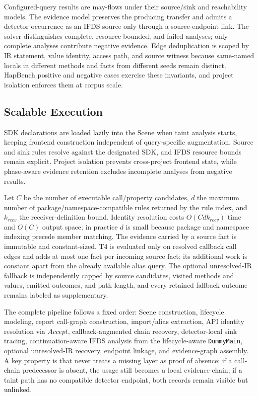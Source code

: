 Configured-query results are may-flows under their source/sink and reachability models. The evidence model preserves the producing transfer and admits a detector occurrence as an IFDS source only through a source-endpoint link. The solver distinguishes complete, resource-bounded, and failed analyses; only complete analyses contribute negative evidence. Edge deduplication is scoped by IR statement, value identity, access path, and source witness because same-named locals in different methods and facts from different seeds remain distinct. HapBench positive and negative cases exercise these invariants, and project isolation enforces them at corpus scale.

\subsection{Scalable Execution}

SDK declarations are loaded lazily into the Scene when taint analysis starts, keeping frontend construction independent of query-specific augmentation. Source and sink rules resolve against the designated SDK, and IFDS resource bounds remain explicit. Project isolation prevents cross-project frontend state, while phase-aware evidence retention excludes incomplete analyses from negative results.

Let $C$ be the number of executable call/property candidates, $d$ the maximum number of package/namespace-compatible rules returned by the rule index, and $k_{recv}$ the receiver-definition bound. Identity resolution costs $O(Cdk_{recv})$ time and $O(C)$ output space; in practice $d$ is small because package and namespace indexing precede member matching. The evidence carried by a source fact is immutable and constant-sized. T4 is evaluated only on resolved callback call edges and adds at most one fact per incoming source fact; its additional work is constant apart from the already available alias query. The optional unresolved-IR fallback is independently capped by source candidates, visited methods and values, emitted outcomes, and path length, and every retained fallback outcome remains labeled as supplementary.

The complete pipeline follows a fixed order: Scene construction, lifecycle modeling, report call-graph construction, import/alias extraction, API identity resolution via $\mathit{Accept}$, callback-augmented chain recovery, detector-local sink tracing, continuation-aware IFDS analysis from the lifecycle-aware \texttt{DummyMain}, optional unresolved-IR recovery, endpoint linkage, and evidence-graph assembly. A key property is that \mytool never treats a missing layer as proof of absence: if a call-chain predecessor is absent, the usage still becomes a local evidence chain; if a taint path has no compatible detector endpoint, both records remain visible but unlinked.
